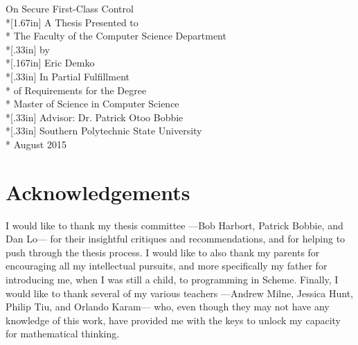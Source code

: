 \documentclass[11pt]{article}
\begin{document}
\newpage

\vspace*{2in}
\begin{center}
{\LARGE On Secure First-Class Control} \\*[1.67in]
A Thesis Presented to \\*
The Faculty of the Computer Science Department \\*[.33in]
by \\*[.167in]
Eric Demko \\*[.33in]
In Partial Fulfillment \\*
of Requirements for the Degree \\*
Master of Science in Computer Science \\*[.33in]
Advisor: Dr. Patrick Otoo Bobbie \\*[.33in]
Southern Polytechnic State University \\*
August 2015
\end{center}


\newpage
\section*{Acknowledgements}

I would like to thank my thesis committee ---Bob Harbort, Patrick Bobbie, and Dan Lo--- for their insightful critiques and recommendations, and for helping to push through the thesis process.
I would like to also thank my parents for encouraging all my intellectual pursuits, and more specifically my father for introducing me, when I was still a child, to programming in Scheme.
Finally, I would like to thank several of my various teachers ---Andrew Milne, Jessica Hunt, Philip Tiu, and Orlando Karam--- who, even though they may not have any knowledge of this work, have provided me with the keys to unlock my capacity for mathematical thinking.
\end{document}
